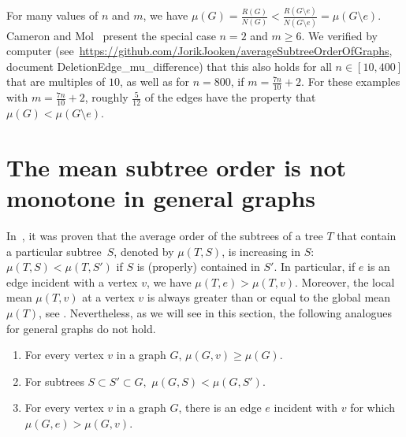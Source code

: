 \documentclass[11pt]{article}
\theoremstyle{definition}
\begin{document}
For many values of $n$ and $m$, we have $\mu(G)=\frac{R(G)}{N(G)}<\frac{R(G\setminus e)}{N(G\setminus e)}=\mu(G \setminus e)$. Cameron and Mol~\cite{CM21} present the special case $n = 2$ and $m \ge 6$. We verified by computer (see~\url{https://github.com/JorikJooken/averageSubtreeOrderOfGraphs}, document DeletionEdge\_mu\_difference) that this also holds for all $n \in [10,400]$ that are multiples of $10$, as well as for $n = 800$, if $m= \frac{7n}{10}+2$. For these examples with $m = \frac{7n}{10} + 2$, roughly $\frac{5}{12}$ of the edges have the property that $\mu(G)<\mu(G \setminus e)$.




\section{The mean subtree order is not monotone in general graphs}\label{sec:nomonotonicity}


In~\cite{jamison_monotonicity_1984}, it was proven that the average order of the subtrees of a tree $T$ that contain a particular subtree~$S$, denoted by $\mu(T, S)$, is increasing in $S$: $\mu(T,S) < \mu(T,S')$ if $S$ is (properly) contained in $S'$. In particular, if $e$ is an edge incident with a vertex $v$, we have $\mu(T,e) > \mu(T,v)$.
Moreover, the local mean $\mu(T,v)$ at a vertex $v$ is always greater than or equal to the global mean $\mu(T)$, see \cite{jamison_average_1983}.
Nevertheless, as we will see in this section, the following analogues for general graphs do not hold.

\begin{enumerate}
 \item\label{itm:1} For every vertex $v$ in a graph $G$, $\mu(G,v) \ge \mu(G).$
 \item\label{itm:2} For subtrees $S \subset S'\subset G,$
 $\mu(G,S)<\mu(G,S')$.
 \item\label{itm:3} For every vertex $v$ in a graph $G$, there is an edge $e$ incident with $v$ for which $\mu(G,e)>\mu(G,v).$
\end{enumerate}
\end{document}
